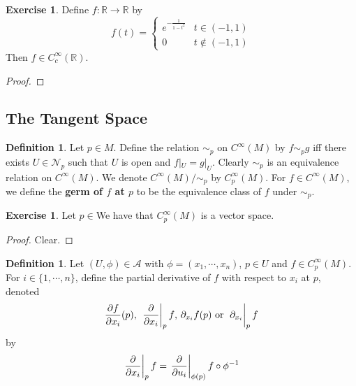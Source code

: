 \documentclass[12pt]{amsart}
\theoremstyle{definition}
\newtheorem{defn}[definition]{Definition}
\theoremstyle{definition}
\newtheorem{ex}[definition]{Exercise}
\newcommand{\R}{\mathbb{R}}
\newcommand{\MA}{\mathcal{A}}
\newcommand{\MN}{\mathcal{N}}
\begin{document}
	\begin{ex}
	Define $f:\R \rightarrow \R$ by 
	\[
	f(t) = 
	\begin{cases}
	e^{-\frac{1}{1-t^2}} & t \in (-1,1)\\
	0 &  t \not \in (-1,1)
	\end{cases}
	\]
	Then $f \in C_c^{\infty}(\R)$.
	\end{ex}
	
	\begin{proof}
	
	\end{proof}
	
	
















	\newpage
	\subsection{The Tangent Space}

	\begin{defn}
		Let $p \in M$. Define the relation $\sim_p$ on $C^{\infty}(M)$ by $f \sim_p g$ iff there exists $U \in \MN_p$ such that $U$ is open and $f|_U = g|_U$. Clearly $\sim_p$ is an equivalence relation on $C^{\infty}(M)$. We denote $C^{\infty}(M) / \sim_p$ by $C^{\infty}_p(M)$. For $f \in C^{\infty}(M)$, we define the \textbf{germ of $f$ at $p$} to be the equivalence class of $f$ under $\sim_p$. 
	\end{defn}
	
	\begin{ex}
		Let $p \in $We have that $C_p^{\infty}(M)$ is a vector space.
	\end{ex}
	
	\begin{proof}
		Clear.
	\end{proof}

	\begin{defn}
		Let $(U, \phi) \in \MA$ with $\phi = (x_1, \cdots, x_n)$, $p \in U$ and $f \in C_p^{\infty}(M)$. For $i \in \{1, \cdots, n\}$, define the partial derivative of $f$ with respect to $x_i$ at $p$, denoted $$\frac{\partial f}{\partial x_i} (p) \text{, } \eval{\pdv{x_i}}_{p} f \text{, } \partial_{x_i} f (p) \text{ or } \eval{\partial_{x_i}}_{p} f$$ by $$ \eval{\pdv{x_i}}_{p} f =  \eval{\pdv{u_i}}_{\phi(p)} f \circ \phi^{-1} $$
	\end{defn}
\end{document}
